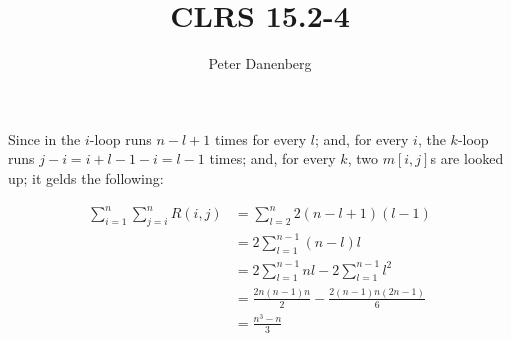 \documentclass{article}
\title{CLRS 15.2-4}
\author{Peter Danenberg}
\begin{document}
\maketitle

Since in  the $i$-loop runs $n - l + 1$ times
for every $l$; and, for every $i$, the $k$-loop runs $j - i = i + l -
1 - i = l - 1$ times; and, for every $k$, two $m[i,j]$s are looked up;
it gelds the following:

\begin{align}
  \sum_{i=1}^n\sum_{j=i}^nR(i,j) &= \sum_{l=2}^n2(n-l+1)(l-1)\\
  &= 2\sum_{l=1}^{n-1}(n-l)l\\
  &= 2\sum_{l=1}^{n-1}nl-2\sum_{l=1}^{n-1}l^2\\
  &= \frac{2n(n-1)n}{2} - \frac{2(n-1)n(2n-1)}{6}\\
  &= \frac{n^3 - n}{3}
\end{align}
\end{document}
